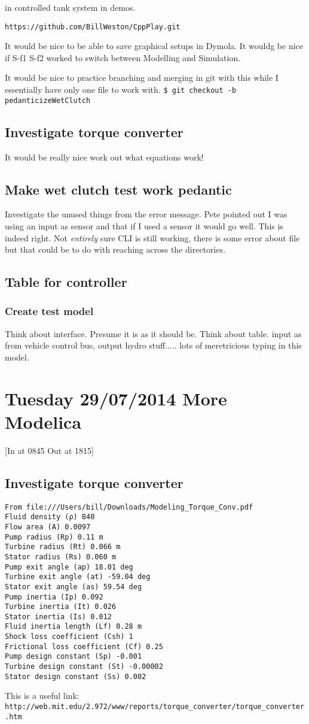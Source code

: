 \documentclass[11pt, oneside]{article}   	%
\begin{document}
in controlled tank system in demos.

\verb+https://github.com/BillWeston/CppPlay.git+

It would be nice to be able to save graphical setups in Dymola.
It wouldg be nice if S-f1 S-f2 worked to switch between Modelling and Simulation.

It would be nice to practice branching and merging in git with this
while I essentially have only one file to work with.
\verb+$ git checkout -b pedanticizeWetClutch+

\subsection{Investigate torque converter}
It would be really nice work out what equations work!
\subsection{Make wet clutch test work pedantic}
Investigate the unused things from the error message.
Pete pointed out I was using an input as sensor and that if I used a
sensor it would go well.   This is indeed right.   Not {\em entirely}
sure CLI is still working, there is some error about file but that
could be to do with reaching across the directories.
\subsection{Table for controller}
\subsubsection{Create test model}
Think about interface.  Presume it is as it should be.  Think about table.  
input as from vehicle control bus, output hydro stuff..... lots of
meretricious typing in this model.

\section{Tuesday 29/07/2014  More Modelica}
[In at 0845 Out at 1815]
\subsection{Investigate torque converter}
\begin{verbatim}
From file:///Users/bill/Downloads/Modeling_Torque_Conv.pdf
Fluid density (ρ) 840 
Flow area (A) 0.0097 
Pump radius (Rp) 0.11 m 
Turbine radius (Rt) 0.066 m 
Stator radius (Rs) 0.060 m
Pump exit angle (ap) 18.01 deg
Turbine exit angle (at) -59.04 deg
Stator exit angle (as) 59.54 deg
Pump inertia (Ip) 0.092 
Turbine inertia (It) 0.026 
Stator inertia (Is) 0.012 
Fluid inertia length (Lf) 0.28 m
Shock loss coefficient (Csh) 1
Frictional loss coefficient (Cf) 0.25
Pump design constant (Sp) -0.001 
Turbine design constant (St) -0.00002 
Stator design constant (Ss) 0.002
\end{verbatim}
This is a useful link:
\verb+http://web.mit.edu/2.972/www/reports/torque_converter/torque_converter.htm+
\end{document}
